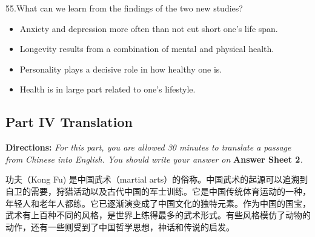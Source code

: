 \documentclass[UTF8,11pt]{ctexart}
\begin{document}
55.What can we learn from the findings of the two new studies?


\begin{itemize}[leftmargin=2em,itemsep=.2em,topsep=.4em]\item[A.] Anxiety and depression more often than not cut short one's life span.
\item[B.] Longevity results from a combination of mental and physical health.
\item[C.] Personality plays a decisive role in how healthy one is.
\item[D.] Health is in large part related to one's lifestyle.
\end{itemize}

\subsection*{\textbf{Part IV} \textbf{Translation}}


\textbf{Directions:}\textit{ For this part, you are allowed 30 minutes to translate a passage from Chinese into English. You should} \textit{write your answer on}\textbf{ Answer Sheet 2}\textit{.}


功夫（Kong Fu) 是中国武术（martial arts）的俗称。中国武术的起源可以追溯到自卫的需要，狩猎活动以及古代中国的军士训练。它是中国传统体育运动的一种，年轻人和老年人都练。它已逐渐演变成了中国文化的独特元素。作为中国的国宝，武术有上百种不同的风格，是世界上练得最多的武术形式。有些风格模仿了动物的动作，还有一些则受到了中国哲学思想，神话和传说的启发。
\end{document}
